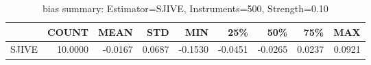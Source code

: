 \begin{table}[ht]
\centering
\caption{bias summary: Estimator=SJIVE, Instruments=500, Strength=0.10}
\begin{tabular}{lrrrrrrrr}
\toprule
 & COUNT & MEAN & STD & MIN & 25\% & 50\% & 75\% & MAX \\
\midrule
SJIVE & 10.0000 & -0.0167 & 0.0687 & -0.1530 & -0.0451 & -0.0265 & 0.0237 & 0.0921 \\
\bottomrule
\end{tabular}
\end{table}
